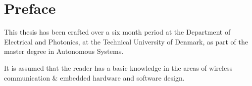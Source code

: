 \section*{Preface}
This thesis has been crafted over a six month period at the Department of Electrical and Photonics, at the Technical University of Denmark, as part of the master degree in Autonomous Systems.

It is assumed that the reader has a basic knowledge in the areas of wireless communication \& embedded hardware and software design.